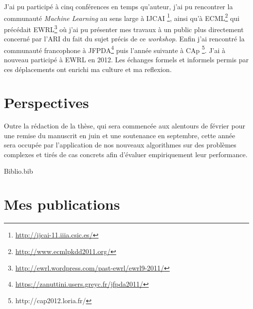\documentclass[11pt]{article}
\begin{document}
  J'ai pu participé à cinq conférences en temps qu'auteur, j'ai pu rencontrer la communauté \emph{Machine Learning} au sens large à IJCAI \footnote{\href{http://ijcai-11.iiia.csic.es/}{http://ijcai-11.iiia.csic.es/}
 }, ainsi qu'à ECML\footnote{\href{http://www.ecmlpkdd2011.org/}{http://www.ecmlpkdd2011.org/}
 } qui précédait EWRL\footnote{\href{http://ewrl.wordpress.com/past-ewrl/ewrl9-2011/}{http://ewrl.wordpress.com/past-ewrl/ewrl9-2011/}
 } où j'ai pu présenter mes travaux à un public plus directement concerné par l'ARI du fait du sujet précis de ce \emph{workshop}. Enfin j'ai rencontré la communauté francophone à JFPDA\footnote{\href{https://zanuttini.users.greyc.fr/jfpda2011/}{https://zanuttini.users.greyc.fr/jfpda2011/}} puis l'année suivante à CAp \footnote{http://cap2012.loria.fr/}. J'ai à nouveau participé à EWRL en 2012. Les échanges formels et informels permis par ces déplacements ont enrichi ma culture et ma reflexion.

  
\section{Perspectives}
\label{sec-4}

Outre la rédaction de la thèse, qui sera commencée aux alentours de février pour une remise du manuscrit en juin et une soutenance en septembre, cette année sera occupée par l'application de nos nouveaux algorithmes sur des problèmes complexes et tirés de cas concrets afin d'évaluer empiriquement leur performance.
  
 \begin{btSect}[alpha]{Biblio.bib}
 \section{Mes publications}
 \nocite{klein2011dimensionality,klein2011batch,klein2011batch2,klein2011batch3,klein2012,Supelec773}
 \btPrintCited
 \end{btSect}
\end{document}

